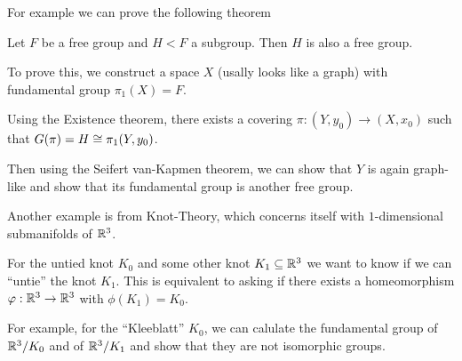For example we can prove the following theorem
\begin{thm}[]
Let $F$ be a free group and $H < F$ a subgroup. Then $H$ is also a free group.
\end{thm}
To prove this, we construct a space $X$ (usally looks like a graph) with fundamental group $\pi_1(X) = F$.

Using the Existence theorem, there exists a covering $\pi:(Y,y_0) \to  (X,x_0)$ such that $G(\pi) = H \cong \pi_1(Y,y_0)$.

Then using the Seifert van-Kapmen theorem, we can show that $Y$ is again graph-like and show that its fundamental group is another free group.

Another example is from Knot-Theory, which concerns itself with $1$-dimensional submanifolds of $\mathbb{R}^{3}$.

For the untied knot $K_0$ and some other knot $K_1 \subseteq \mathbb{R}^{3}$ we want to know if we can ``untie'' the knot $K_1$.
This is equivalent to asking if there exists a homeomorphism $\varphi:\mathbb{R}^{3} \to \mathbb{R}^{3}$ with $\phi(K_1) = K_0$.

For example, for the ``Kleeblatt'' $K_0$, we can calulate the fundamental group of $\mathbb{R}^{3}/K_0$ and of $\mathbb{R}^{3}/K_1$ and show that they are not isomorphic groups.


